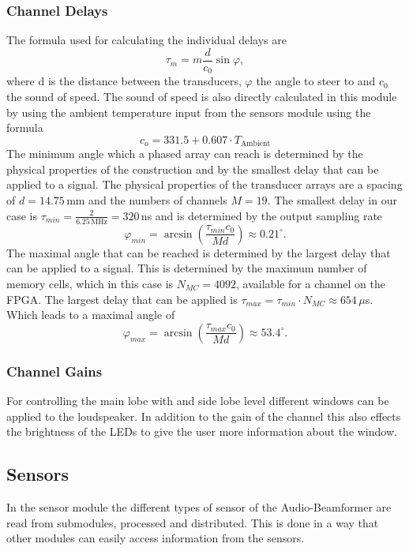 \subsubsection{Channel Delays} \label{beamsteering_delays}
The formula used for calculating the individual delays are
\begin{equation}
    \tau_m = m\frac{d}{c_0}\sin{\varphi},
\end{equation}
where d is the distance between the transducers, $\varphi$ the angle to steer to and $c_0$ the sound of speed. The sound of speed is also directly calculated in this module by using the ambient temperature input from the sensors module using the formula
\begin{equation}
    c_o = 331.5 + 0.607 \cdot T_{\text{Ambient}}
    \label{equ:speed_of_sound}
\end{equation}
The minimum angle which a phased array can reach is determined by the physical properties of the construction and by the smallest delay that can be applied to a signal. The physical properties of the transducer arrays are a spacing of $d=14.75 \,$mm and the numbers of channels $M=19$. The smallest delay in our case is $\tau_{min} = \frac{2}{6.25 \,\text{MHz}} = 320\,$ns and is determined by the output sampling rate
\begin{equation}
    \varphi_{min} = \arcsin{\left ( \frac{\tau_{min} c_0}{M d} \right ) } \approx  0.21^{\circ}.
\end{equation}
The maximal angle that can be reached is determined by the largest delay that can be applied to a signal. This is determined by the maximum number of memory cells, which in this case is $N_{MC} = 4092$, available for a channel on the FPGA. The largest delay that can be applied is $\tau_{max} = \tau_{min} \cdot N_{MC} \approx 654 \, \mu$s. Which leads to a maximal angle of 
\begin{equation}
    \varphi_{max} = \arcsin{\left ( \frac{\tau_{max} c_0}{M d} \right ) } \approx  53.4^{\circ}.
\end{equation}
\subsubsection{Channel Gains}
For controlling the main lobe with and side lobe level different windows can be applied to the loudspeaker. In addition to the gain of the channel this also effects the brightness of the LEDs to give the user more information about the window. 
\subsection{Sensors}
In the sensor module the different types of sensor of the Audio-Beamformer are read from submodules, processed and distributed. This is done in a way that other modules can easily access information from the sensors. 

